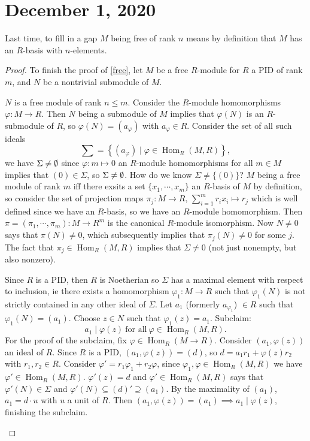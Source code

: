 \section{December 1, 2020}
Last time, to fill in a gap $M$ being free of rank $n$ means by definition that $M$ has an $R$-basis with $n$-elements. 
\begin{proof}
    To finish the proof of \cref{free}, let $M$ be a free $R$-module for $R$ a PID of rank $m$, and $ N$ be a nontrivial submodule of $M$.

\begin{claim}
    $N$ is a free module of rank $n\leq m$. Consider the $R$-module homomorphisms $\varphi \colon M \to R$. Then $N$ being a submodule of $M$ implies that $\varphi (N)$ is an $R$-submodule of $R$, so $\varphi (N)=(a_{\varphi })$ with $a_{\varphi }\in R$. Consider the set of all such ideals \[
        \sum=\left\{\left( a_{\varphi } \right)  \mid \varphi \in \operatorname{Hom}_R(M,R)\right\} ,
    \] we have $\Sigma\neq \emptyset$ since $\varphi \colon m \mapsto 0 $ an $R$-module homomorphisms for all $m\in M$ implies that $(0)\in \Sigma$, so $\Sigma\neq \emptyset$. How do we know $\Sigma \neq \{\left( 0 \right) \} $? $M$ being a free module of rank $m$ iff there exsits a set $\{x_1,\cdots ,x_m\} $ an $R$-basis of $M$ by definition, so consider the set of projection maps $\pi_j \colon M \to R,\, \sum_{i=1}^{m} r_i x_i \mapsto r_j  $ which is well defined since we have an $R$-basis, so we have an $R$-module homomorphism. Then $\pi=\left( \pi_1,\cdots ,\pi_m \right) \colon M \to R^m$ is the canonical $R$-module isomorphism. Now $N\neq 0$ says that $\pi(N)\neq 0$, which subsequently implies that $\pi_j (N)\neq 0$ for some $j$. The fact that $\pi_j \in \operatorname{Hom}_R(M,R)$ implies that $\Sigma \neq 0$ (not just nonempty, but also nonzero).

    Since $R$ is a PID, then $R$ is Noetherian so $\Sigma$ has a maximal element with respect to inclusion, ie there exists a homomorphism $\varphi_1 \colon M \to R$ such that $\varphi_1(N) $ is not strictly contained in any other ideal of $\Sigma$. Let $a_1$ (formerly $a_{\varphi_1 }$) $\in R$ such that $\varphi_1(N)=(a_1) $. Choose $z\in N$ such that $\varphi_1(z)=a_1 $. Subclaim:
       \[
           a_1 \mid \varphi (z) \ \text{for all} \ \varphi \in \operatorname{Hom}_R(M,R).
       \]  For the proof of the subclaim, fix $\varphi \in \operatorname{Hom}_R(M\to R)$. Consider $\left( a_1,\varphi (z) \right) $ an ideal of $R$. Since $R$ is a PID, $\left( a_1,\varphi (z) \right) =(d)$, so $d=a_1r_1+\varphi (z)r_2$ with $r_1,r_2\in R$. Consider $\varphi '=r_1\varphi_1+r_2\varphi  $, since $\varphi_1,\varphi \in \operatorname{Hom}_R(M,R) $ we have $\varphi '\in \operatorname{Hom}_R(M,R)$. $\varphi '(z)=d$ and $\varphi '\in \operatorname{Hom}_R(M,R)$ says that $\varphi '(N)\in \Sigma$ and $\varphi '(N) \subseteq (d)'\supseteq (a_1)$. By the maximality of $(a_1)$, $a_1=d\cdot u$ with $u$ a unit of $R$. Then $(a_1,\varphi (z))=(a_1)\implies a_1 \mid \varphi (z)$, finishing the subclaim.


\end{claim}
\end{proof}
